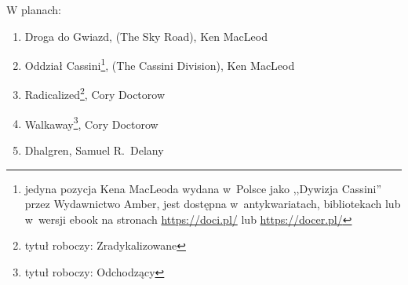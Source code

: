 \documentclass[oneside,polish,11pt,sfheadings]{mwbk}
\begin{document}
\begin{center}

\begin{large}W planach:\end{large}\end{center}

\begin{enumerate}
\item Droga do Gwiazd, (The Sky Road), Ken MacLeod
\item Oddział Cassini\footnote{ jedyna pozycja Kena MacLeoda wydana w~Polsce jako ,,Dywizja Cassini'' przez Wydawnictwo Amber, jest dostępna w~antykwariatach, bibliotekach lub w~wersji ebook na stronach \url{https://doci.pl/} lub \url{https://docer.pl/}}, (The Cassini Division), Ken MacLeod
\item Radicalized\footnote{tytuł roboczy: Zradykalizowane}, Cory Doctorow
\item Walkaway\footnote{tytuł roboczy: Odchodzący}, Cory Doctorow
\item Dhalgren, Samuel R.~Delany
\end{enumerate}


\tableofcontents{}
\end{document}
